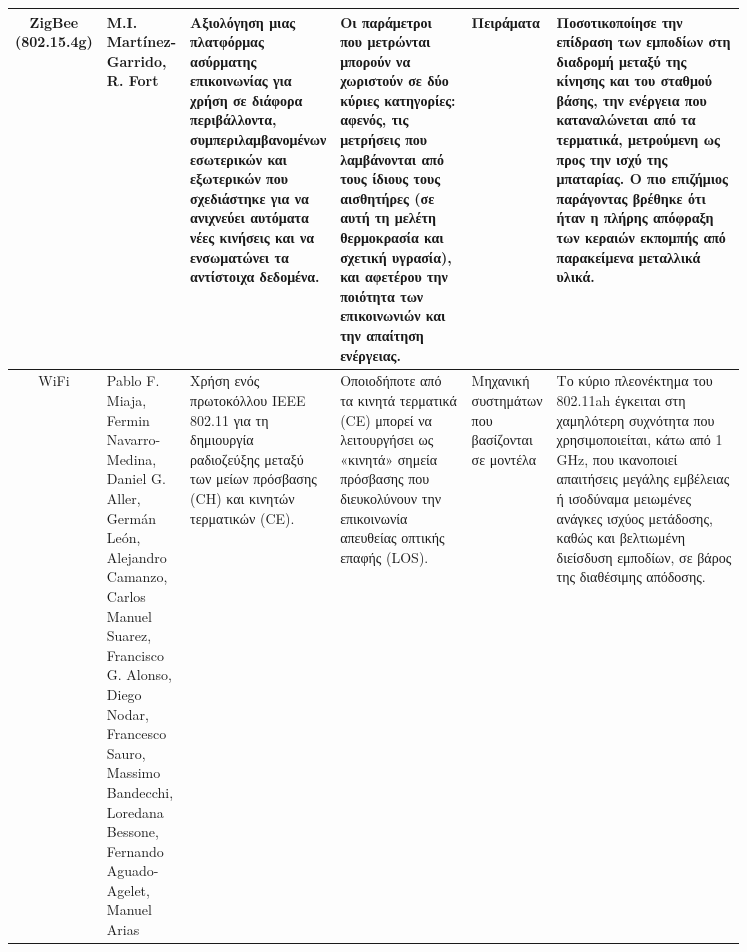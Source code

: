 \begin{landscape}
\begin{longtable}{cp{0.1\linewidth}p{0.15\linewidth}p{0.20\linewidth}p{0.1\linewidth}p{0.3\linewidth}}
        ZigBee (802.15.4g) & M.I. Martínez-Garrido, R. Fort \cite{martinez-garrido_experimental_2016} &
        Αξιολόγηση μιας πλατφόρμας ασύρματης επικοινωνίας για χρήση σε διάφορα περιβάλλοντα, 
        συμπεριλαμβανομένων εσωτερικών και εξωτερικών που σχεδιάστηκε για να ανιχνεύει αυτόματα νέες
        κινήσεις και να ενσωματώνει τα αντίστοιχα δεδομένα.&
        Οι παράμετροι που μετρώνται μπορούν να χωριστούν σε δύο
        κύριες κατηγορίες: αφενός, τις μετρήσεις που λαμβάνονται από τους ίδιους τους αισθητήρες 
        (σε αυτή τη μελέτη θερμοκρασία και σχετική υγρασία), και αφετέρου την ποιότητα των επικοινωνιών
        και την απαίτηση ενέργειας.& Πειράματα &
        Ποσοτικοποίησε την επίδραση των εμποδίων στη διαδρομή μεταξύ της κίνησης και του σταθμού βάσης, 
        την ενέργεια που καταναλώνεται από τα τερματικά, μετρούμενη ως προς την ισχύ της μπαταρίας. 
        Ο πιο επιζήμιος παράγοντας βρέθηκε ότι ήταν η πλήρης απόφραξη των κεραιών εκπομπής από 
        παρακείμενα μεταλλικά υλικά.\\
        \hline
        WiFi & Pablo F. Miaja, Fermin Navarro-Medina, Daniel G. Aller, Germán León,
        Alejandro Camanzo, Carlos Manuel Suarez, Francisco G. Alonso, Diego Nodar,
        Francesco Sauro, Massimo Bandecchi, Loredana Bessone, Fernando Aguado-Agelet, Manuel Arias
        & Χρήση ενός πρωτοκόλλου IEEE 802.11 για τη δημιουργία ραδιοζεύξης μεταξύ των μείων πρόσβασης (CH)
        και κινητών τερματικών (CE).
        & Οποιοδήποτε από τα κινητά τερματικά (CE) μπορεί να λειτουργήσει ως «κινητά» σημεία πρόσβασης 
        που διευκολύνουν την επικοινωνία απευθείας οπτικής επαφής (LOS). &
        Mηχανική συστημάτων που βασίζονται σε μοντέλα &
        Το κύριο πλεονέκτημα του 802.11ah έγκειται στη χαμηλότερη συχνότητα που χρησιμοποιείται,
        κάτω από 1 GHz, που ικανοποιεί απαιτήσεις μεγάλης εμβέλειας ή ισοδύναμα μειωμένες ανάγκες
        ισχύος μετάδοσης, καθώς και βελτιωμένη διείσδυση εμποδίων, σε βάρος της διαθέσιμης απόδοσης.\\
    \end{longtable}
\end{landscape}
